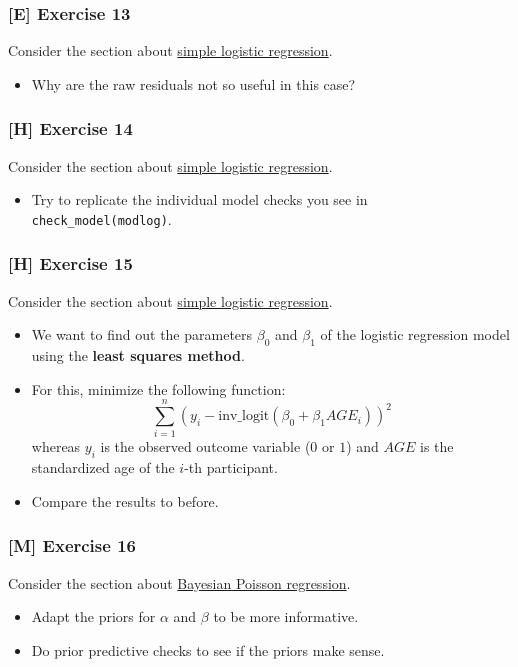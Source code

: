 \documentclass[
]{article}
\providecommand{\tightlist}{%
  \setlength{\itemsep}{0pt}\setlength{\parskip}{0pt}}
\begin{document}
\subsubsection{{[}E{]} Exercise 13}\label{exercise13_LMM}

Consider the section about \hyperref[simple_logistic_regression]{simple
logistic regression}.

\begin{itemize}
\tightlist
\item
  Why are the raw residuals not so useful in this case?
\end{itemize}

\subsubsection{{[}H{]} Exercise 14}\label{exercise14_LMM}

Consider the section about \hyperref[simple_logistic_regression]{simple
logistic regression}.

\begin{itemize}
\tightlist
\item
  Try to replicate the individual model checks you see in
  \texttt{check\_model(modlog)}.
\end{itemize}

\subsubsection{{[}H{]} Exercise 15}\label{exercise15_LMM}

Consider the section about \hyperref[simple_logistic_regression]{simple
logistic regression}.

\begin{itemize}
\tightlist
\item
  We want to find out the parameters \(\beta_0\) and \(\beta_1\) of the
  logistic regression model using the \textbf{least squares method}.
\item
  For this, minimize the following function:
  \[\sum_{i=1}^n (y_i - \text{inv_logit}(\beta_0 + \beta_1 AGE_i))^2\]
  whereas \(y_i\) is the observed outcome variable (\(0\) or \(1\)) and
  \(AGE\) is the standardized age of the \(i\)-th participant.
\item
  Compare the results to before.
\end{itemize}

\subsubsection{{[}M{]} Exercise 16}\label{exercise16_LMM}

Consider the section about
\hyperref[bayesian_poisson_regression]{Bayesian Poisson regression}.

\begin{itemize}
\tightlist
\item
  Adapt the priors for \(\alpha\) and \(\beta\) to be more informative.
\item
  Do prior predictive checks to see if the priors make sense.
\end{itemize}
\end{document}
